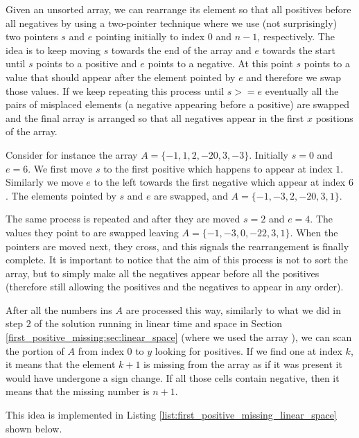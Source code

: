 Given an unsorted array, we can rearrange its element so that all positives before all negatives by using a two-pointer technique where we use  (not surprisingly) two pointers $s$ and $e$ pointing initially to index $0$ and $n-1$, respectively.
The idea is to keep moving $s$ towards the end of the array and $e$ towards the start until $s$ points to a positive and $e$ points to a negative. At this point $s$ points to a value that should appear after the element pointed by $e$ and therefore we swap those values. 
If we keep repeating this process until $s>=e$ eventually all the pairs of misplaced elements (a negative appearing before a positive) are swapped and the final array is arranged so that all negatives appear in the first $x$ positions of the array.

Consider for instance the array $A=\{-1, 1, 2,-2 0,3,-3\}$. Initially $s=0$ and $e=6$. We first move $s$ to the first positive which happens to appear at index $1$. Similarly we move $e$ to the left towards the first negative which appear at index $6$. The elements pointed by $s$ and $e$ are swapped, and $A=\{-1, -3, 2,-2 0,3,1\}$.

The same process is repeated and after they are moved $s=2$ and $e=4$. 
The values they point to are swapped leaving $A=\{-1, -3, 0,-2 2,3,1\}$. When the pointers are moved next, they cross, and this signals the rearrangement is finally complete. It is important to notice that the aim of this process is not to sort the array, but to simply make all the negatives appear before all the positives (therefore still allowing the positives and the negatives to appear in any order).


After all the numbers ins $A$ are processed this way, similarly to what we did in step $2$ of the solution running in linear time and space in Section \ref{first_positive_missing:sec:linear_space} (where we used the array ), we can scan the portion of $A$ from index $0$ to $y$ looking for positives. 
If we find one at index $k$, it means that the element $k+1$ is missing from the array as if it was present it would have undergone a sign change. 
If all those cells contain negative, then it means that the missing number is $n+1$.

This idea is implemented in Listing \ref{list:first_positive_missing_linear_space} shown below.




